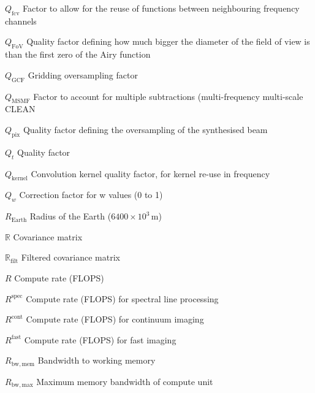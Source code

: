 \documentclass[11pt,a4paper]{article}
\newcommand{\qfacreuse}{Q_\mathrm{fcv}} %
\newcommand{\qfacfov}{Q_\mathrm{FoV}} %
\newcommand{\facgridovers}{Q_\mathrm{GCF}} %
\newcommand{\facmsmf}{Q_\mathrm{MSMF}} %
\newcommand{\qfacbeamovers}{Q_\mathrm{pix}} %
\newcommand{\qfac}{Q_t} %
\newcommand{\corrfacw}{Q_w} %
\newcommand{\earthrad}{R_\mathrm{Earth}} %
\newcommand{\comprate}{R} %
\newcommand{\compratespec}{R^\mathrm{spec}} %
\newcommand{\compratecont}{R^\mathrm{cont}} %
\newcommand{\compratefast}{R^\mathrm{fast}} %
\newcommand{\covm}{\mathbb{R}} %
\newcommand{\covmfilt}{\mathbb{R}_\mathrm{filt}} %
\newcommand{\bwtoworkmem}{R_\mathrm{bw,mem}} %
\newcommand{\maxmembw}{R_\mathrm{bw,max}} %
\newcommand{\Qkernel}{Q_\mathrm{kernel}} %
\begin{document}
\begin{basedescript}{\desclabelstyle{\pushlabel}\desclabelwidth{6em}}
\item[$\qfacreuse$] Factor to allow for the reuse of functions between
  neighbouring frequency channels \vspace{-0.2cm}
\item[$\qfacfov$] Quality factor defining how much bigger the diameter of the
  field of view is than the first zero of the Airy function \vspace{-0.2cm}
\item[$\facgridovers$] Gridding oversampling factor \vspace{-0.2cm}
\item[$\facmsmf$] Factor to account for multiple subtractions (multi-frequency
  multi-scale CLEAN\vspace{-0.2cm}
\item[$\qfacbeamovers$] Quality factor defining the oversampling of the
  synthesised beam \vspace{-0.2cm}
\item[$\qfac$] Quality factor \vspace{-0.2cm}
\item[$\Qkernel$] Convolution kernel quality factor, for kernel re-use in frequency
\item[$\corrfacw$] Correction factor for w values (0 to 1) \vspace{-0.2cm}
\item[$\earthrad$] Radius of the Earth ($6400\times 10^3$\,m) \vspace{-0.2cm}
\item[$\covm$] Covariance matrix \vspace{-0.2cm}
\item[$\covmfilt$] Filtered covariance matrix \vspace{-0.2cm}
\item[$\comprate$] Compute rate (FLOPS) \vspace{-0.2cm}
\item[$\compratespec$] Compute rate (FLOPS) for spectral line processing \vspace{-0.2cm}
\item[$\compratecont$] Compute rate (FLOPS) for continuum imaging \vspace{-0.2cm}
\item[$\compratefast$] Compute rate (FLOPS) for fast imaging \vspace{-0.2cm}
\item[$\bwtoworkmem$] Bandwidth to working memory \vspace{-0.2cm}
\item[$\maxmembw$] Maximum memory bandwidth of compute unit \vspace{-0.2cm}

\end{basedescript}
\end{document}
